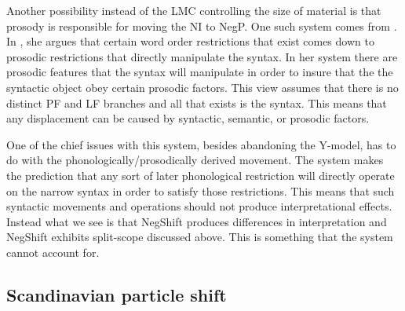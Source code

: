 \documentclass[12pt, letterpaper]{article}
\begin{document}
Another possibility instead of the LMC controlling the size of material is that prosody is responsible for moving the NI to NegP. One such system comes from \citet{zubizarretaProsodyFocusWord1998}. In \citet{zubizarretaProsodyFocusWord1998}, she argues that certain word order restrictions that exist comes down to prosodic restrictions that directly manipulate the syntax. In her system there are prosodic features that the syntax will manipulate in order to insure that the the syntactic object obey certain prosodic factors. This view assumes that there is no distinct PF and LF branches and all that exists is the syntax. This means that any displacement can be caused by syntactic, semantic, or prosodic factors. 

One of the chief issues with this system, besides abandoning the Y-model, has to do with the phonologically/prosodically derived movement. The \citeauthor{zubizarretaProsodyFocusWord1998} system makes the prediction that any sort of later phonological restriction will directly operate on the narrow syntax in order to satisfy those restrictions. This means that such syntactic movements and operations should not produce interpretational effects. Instead what we see is that NegShift produces differences in interpretation and NegShift exhibits split-scope \citep{iatridouNegativeDPsAMovement2011,zeijlstraSyntacticallyComplexStatus2011} discussed above. This is something that the \citeauthor{zubizarretaProsodyFocusWord1998} system cannot account for. 

\subsection{Scandinavian particle shift} \label{sec:Particles}
\end{document}
